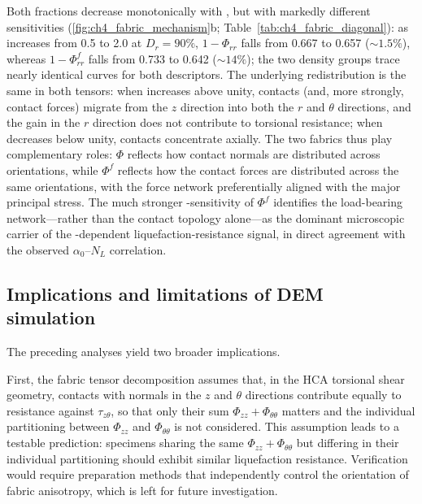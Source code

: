 \documentclass[../main]{subfiles}
\begin{document}
Both fractions decrease monotonically with \Kzero{}, but with markedly different sensitivities (\cref{fig:ch4_fabric_mechanism}b; Table~\ref{tab:ch4_fabric_diagonal}): as \Kzero{} increases from 0.5 to 2.0 at $D_r = 90\%$, $1-\Phi_{rr}$ falls from 0.667 to 0.657 (${\sim}1.5\%$), whereas $1-\Phi^f_{rr}$ falls from 0.733 to 0.642 (${\sim}14\%$); the two density groups trace nearly identical curves for both descriptors. The underlying redistribution is the same in both tensors: when \Kzero{} increases above unity, contacts (and, more strongly, contact forces) migrate from the $z$ direction into both the $r$ and $\theta$ directions, and the gain in the $r$ direction does not contribute to torsional resistance; when \Kzero{} decreases below unity, contacts concentrate axially. The two fabrics thus play complementary roles: $\Phi$ reflects how contact normals are distributed across orientations, while $\Phi^f$ reflects how the contact forces are distributed across the same orientations, with the force network preferentially aligned with the major principal stress. The much stronger \Kzero{}-sensitivity of $\Phi^f$ identifies the load-bearing network---rather than the contact topology alone---as the dominant microscopic carrier of the \Kzero{}-dependent liquefaction-resistance signal, in direct agreement with the observed $\alpha_0$--$N_L$ correlation.

\subsection{Implications and limitations of DEM simulation}
\label{subsec:ch4_implications_sim}

The preceding analyses yield two broader implications.

First, the fabric tensor decomposition assumes that, in the HCA torsional shear geometry, contacts with normals in the $z$ and $\theta$ directions contribute equally to resistance against $\tau_{z\theta}$, so that only their sum $\Phi_{zz} + \Phi_{\theta\theta}$ matters and the individual partitioning between $\Phi_{zz}$ and $\Phi_{\theta\theta}$ is not considered. This assumption leads to a testable prediction: specimens sharing the same $\Phi_{zz} + \Phi_{\theta\theta}$ but differing in their individual partitioning should exhibit similar liquefaction resistance. Verification would require preparation methods that independently control the orientation of fabric anisotropy, which is left for future investigation.
\end{document}
